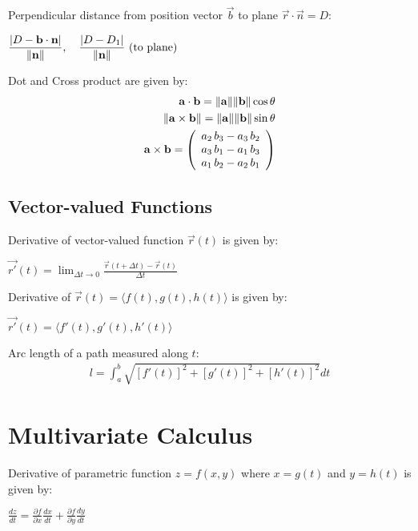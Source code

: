 \documentclass[12pt, a4paper]{article}
\begin{document}
\begin{multicols*}{3}
Perpendicular distance from position vector $\vec{b}$ to plane $\vec{r} \cdot \vec{n} = D$:\\
{\centering
  $\displaystyle \frac{|D - \mathbf{b}\cdot \mathbf{n}|}{\lVert\mathbf{n}\rVert},\quad \frac{|D - D_1|}{\lVert\mathbf{n}\rVert}\text{ (to plane)}$
\par}

Dot and Cross product are given by:
\begin{align*}
  \mathbf{a} \cdot \mathbf{b} = \lVert\mathbf{a}\rVert\lVert\mathbf{b}\rVert\cos\theta\\
  \lVert\mathbf{a}\times \mathbf{b}\rVert = \lVert\mathbf{a}\rVert\lVert\mathbf{b}\rVert\sin\theta\\
  \mathbf{a} \times \mathbf{b} = \left(\begin{array}{c} a_{2}\,b_{3}-a_{3}\,b_{2}\\ a_{3}\,b_{1}-a_{1}\,b_{3}\\ a_{1}\,b_{2}-a_{2}\,b_{1} \end{array}\right)
\end{align*}

\subsection{Vector-valued Functions}
Derivative of vector-valued function $\vec{r}(t)$ is given by:\\\vspace{0.5em}
{\centering
  $\displaystyle \vec{r'}(t) = \lim_{\Delta t\rightarrow 0} \frac{\vec{r}(t+\Delta t) - \vec{r}(t)}{\Delta t}$
\par}
Derivative of $\vec{r}(t) = \langle f(t), g(t), h(t)\rangle$ is given by:\\\vspace{0.5em}
{\centering
  $\displaystyle \vec{r'}(t) = \langle f'(t), g'(t), h'(t)\rangle$
\par}

Arc length of a path measured along $t$:
\begin{align*}
  l = \int^b_a \sqrt{[f'(t)]^2 + [g'(t)]^2 + [h'(t)]^2}dt
\end{align*}
\colbreak

\section{Multivariate Calculus}
Derivative of parametric function $z=f(x,y)$ where $x=g(t)$ and $y=h(t)$ is given by:\\\vspace{0.5em}
{\centering
  $\displaystyle \frac{dz}{dt} = \frac{\partial f}{\partial x}\frac{dx}{dt} + \frac{\partial f}{\partial y} \frac{dy}{dt}$
\par}


\end{multicols*}
\end{document}

